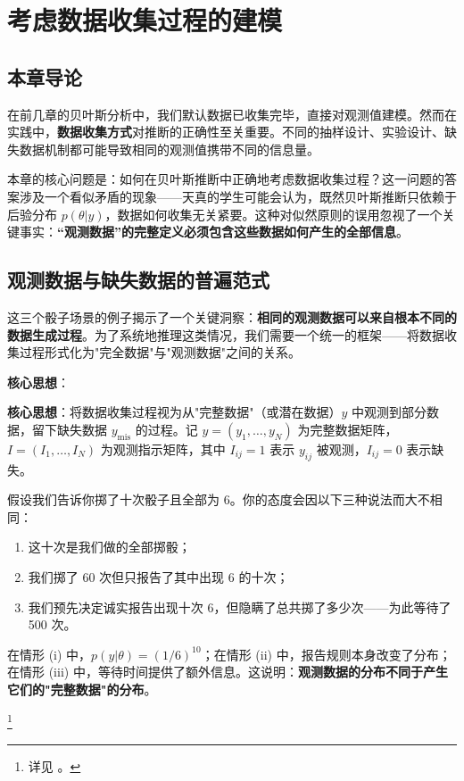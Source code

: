 
\chapter{考虑数据收集过程的建模}

\section{本章导论}

在前几章的贝叶斯分析中，我们默认数据已收集完毕，直接对观测值建模。然而在实践中，\textbf{数据收集方式}对推断的正确性至关重要。不同的抽样设计、实验设计、缺失数据机制都可能导致相同的观测值携带不同的信息量。

本章的核心问题是：如何在贝叶斯推断中正确地考虑数据收集过程？这一问题的答案涉及一个看似矛盾的现象——天真的学生可能会认为，既然贝叶斯推断只依赖于后验分布 $p(\theta|y)$，数据如何收集无关紧要。这种对似然原则的误用忽视了一个关键事实：\textbf{``观测数据''的完整定义必须包含这些数据如何产生的全部信息}。

\section{观测数据与缺失数据的普遍范式}

这三个骰子场景的例子揭示了一个关键洞察：\textbf{相同的观测数据可以来自根本不同的数据生成过程}。为了系统地推理这类情况，我们需要一个统一的框架——将数据收集过程形式化为"完全数据"与"观测数据"之间的关系。

\textbf{核心思想}：

\textbf{核心思想}：将数据收集过程视为从"完整数据"（或潜在数据）$y$ 中观测到部分数据，留下缺失数据 $y_{\mathrm{mis}}$ 的过程。记 $y = (y_1, \ldots, y_N)$ 为完整数据矩阵，$I = (I_1, \ldots, I_N)$ 为观测指示矩阵，其中 $I_{ij} = 1$ 表示 $y_{ij}$ 被观测，$I_{ij} = 0$ 表示缺失。

\begin{Example}[骰子实验]
  假设我们告诉你掷了十次骰子且全部为 6。你的态度会因以下三种说法而大不相同：
  \begin{enumerate}
    \item 这十次是我们做的全部掷骰；
    \item 我们掷了 60 次但只报告了其中出现 6 的十次；
    \item 我们预先决定诚实报告出现十次 6，但隐瞒了总共掷了多少次——为此等待了 500 次。
  \end{enumerate}
  在情形 (i) 中，$p(y|\theta) = (1/6)^{10}$；在情形 (ii) 中，报告规则本身改变了分布；在情形 (iii) 中，等待时间提供了额外信息。这说明：\textbf{观测数据的分布不同于产生它们的"完整数据"的分布}。
\end{Example}\footnote{详见 \cite[ Chapter 8]{gelman2013bayesian}。}

